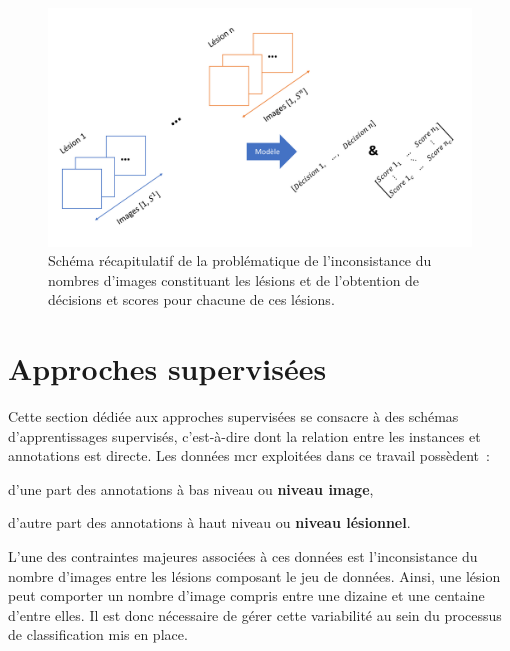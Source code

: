 \begin{figure}[H]
    \centering
    \includegraphics[width=0.65\linewidth]{contents/chapter_7/resources/scheme_patient_decision_objectives.pdf}
    \caption{Schéma récapitulatif de la problématique de l'inconsistance du nombres d'images constituant les lésions et de l'obtention de décisions et scores pour chacune de ces lésions.}
    \label{fig:scheme_patient_decision_objectives}
\end{figure}\par
\clearpage

\section{Approches supervisées}
\label{sec:patient_decision_supervised}
Cette section dédiée aux approches supervisées se consacre à des schémas d'apprentissages supervisés, c'est-à-dire dont la relation entre les instances et annotations est directe. Les données \gls{mcr} exploitées dans ce travail possèdent~:
\begin{inlinerate}
    \item d'une part des annotations à bas niveau ou \textbf{niveau image},
    \item d'autre part des annotations à haut niveau ou \textbf{niveau lésionnel}. 
\end{inlinerate} L'une des contraintes majeures associées à ces données est l'inconsistance du nombre d'images entre les lésions composant le jeu de données. Ainsi, une lésion peut comporter un nombre d'image compris entre une dizaine et une centaine d'entre elles. Il est donc nécessaire de gérer cette variabilité au sein du processus de classification mis en place.\par

